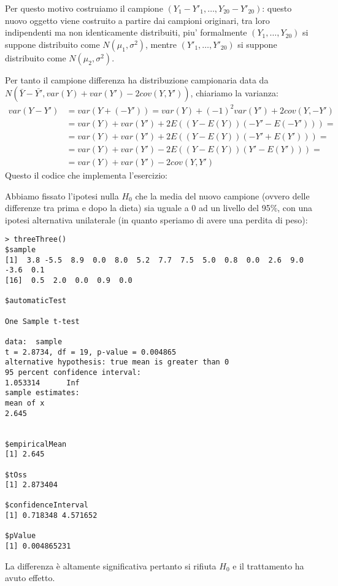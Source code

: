 Per questo motivo costruiamo il campione $(Y_1-Y'_1, \ldots,
Y_{20}-Y'_{20})$: questo nuovo oggetto viene costruito a partire dai
campioni originari, tra loro indipendenti ma non identicamente
distribuiti, piu' formalmente $(Y_1, \ldots, Y_{20})$ si suppone
distribuito come $N(\mu_1, \sigma^2)$, mentre $(Y'_1, \ldots,
Y'_{20})$ si suppone distribuito come $N(\mu_2, \sigma^2)$.

Per tanto il campione differenza ha distribuzione campionaria data da
$N(\bar{Y} - \bar{Y'}, var(Y) + var(Y') -2cov(Y, Y'))$, chiariamo la
varianza:
\begin{displaymath}
  \begin{split}
    var(Y - Y') &= var(Y + (-Y')) = var(Y) + (-1)^2var(Y') +
    2cov(Y,-Y') \\
    &= var(Y) + var(Y') + 2E\left((Y-E(Y))(-Y'-E(-Y')) \right) = \\
    &= var(Y) + var(Y') + 2E\left((Y-E(Y))(-Y'+E(Y')) \right) = \\
    &= var(Y) + var(Y') - 2E\left((Y-E(Y))(Y'-E(Y')) \right) = \\
    &= var(Y) + var(Y') - 2cov(Y,Y')
  \end{split}
\end{displaymath}
Questo il codice che implementa l'esercizio:

Abbiamo fissato l'ipotesi nulla $H_0$ che la media del nuovo campione
(ovvero delle differenze tra prima e dopo la dieta) sia uguale a 0 ad
un livello del 95\%, con una ipotesi alternativa unilaterale (in
quanto speriamo di avere una perdita di peso):
\begin{lstlisting}
> threeThree()
$sample
[1]  3.8 -5.5  8.9  0.0  8.0  5.2  7.7  7.5  5.0  0.8  0.0  2.6  9.0 -3.6  0.1
[16]  0.5  2.0  0.0  0.9  0.0

$automaticTest

One Sample t-test

data:  sample 
t = 2.8734, df = 19, p-value = 0.004865
alternative hypothesis: true mean is greater than 0 
95 percent confidence interval:
1.053314      Inf 
sample estimates:
mean of x 
2.645 


$empiricalMean
[1] 2.645

$tOss
[1] 2.873404

$confidenceInterval
[1] 0.718348 4.571652

$pValue
[1] 0.004865231
\end{lstlisting}
La differenza \`e altamente significativa pertanto si rifiuta $H_0$ e
il trattamento ha avuto effetto.


